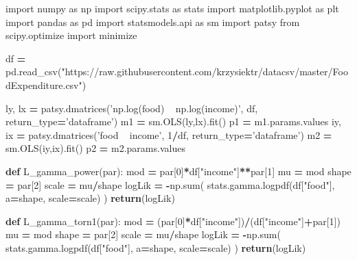 \documentclass[polish,]{book}
\newenvironment{Shaded}{\begin{snugshade}}{\end{snugshade}}
\newcommand{\BuiltInTok}[1]{#1}
\newcommand{\ControlFlowTok}[1]{\textcolor[rgb]{0.13,0.29,0.53}{\textbf{#1}}}
\newcommand{\DecValTok}[1]{\textcolor[rgb]{0.00,0.00,0.81}{#1}}
\newcommand{\ImportTok}[1]{#1}
\newcommand{\KeywordTok}[1]{\textcolor[rgb]{0.13,0.29,0.53}{\textbf{#1}}}
\newcommand{\NormalTok}[1]{#1}
\newcommand{\OperatorTok}[1]{\textcolor[rgb]{0.81,0.36,0.00}{\textbf{#1}}}
\newcommand{\StringTok}[1]{\textcolor[rgb]{0.31,0.60,0.02}{#1}}
\begin{document}
\begin{Shaded}
\begin{Highlighting}[]
\ImportTok{import}\NormalTok{ numpy }\ImportTok{as}\NormalTok{ np}
\ImportTok{import}\NormalTok{ scipy.stats }\ImportTok{as}\NormalTok{ stats}
\ImportTok{import}\NormalTok{ matplotlib.pyplot }\ImportTok{as}\NormalTok{ plt}
\ImportTok{import}\NormalTok{ pandas }\ImportTok{as}\NormalTok{ pd}
\ImportTok{import}\NormalTok{ statsmodels.api }\ImportTok{as}\NormalTok{ sm}
\ImportTok{import}\NormalTok{ patsy}
\ImportTok{from}\NormalTok{ scipy.optimize }\ImportTok{import}\NormalTok{ minimize}

\NormalTok{df }\OperatorTok{=}\NormalTok{ pd.read_csv(}\StringTok{"https://raw.githubusercontent.com/krzysiektr/datacsv/master/FoodExpenditure.csv"}\NormalTok{)}

\NormalTok{ly, lx }\OperatorTok{=}\NormalTok{ patsy.dmatrices(}\StringTok{'np.log(food) ~ np.log(income)'}\NormalTok{, df, return_type}\OperatorTok{=}\StringTok{'dataframe'}\NormalTok{)}
\NormalTok{m1 }\OperatorTok{=}\NormalTok{ sm.OLS(ly,lx).fit()}
\NormalTok{p1 }\OperatorTok{=}\NormalTok{ m1.params.values}
\NormalTok{iy, ix }\OperatorTok{=}\NormalTok{ patsy.dmatrices(}\StringTok{'food ~ income'}\NormalTok{, }\DecValTok{1}\OperatorTok{/}\NormalTok{df, return_type}\OperatorTok{=}\StringTok{'dataframe'}\NormalTok{)}
\NormalTok{m2 }\OperatorTok{=}\NormalTok{ sm.OLS(iy,ix).fit()}
\NormalTok{p2 }\OperatorTok{=}\NormalTok{ m2.params.values}

\KeywordTok{def}\NormalTok{ L_gamma_power(par):}
\NormalTok{    mod }\OperatorTok{=}\NormalTok{ par[}\DecValTok{0}\NormalTok{]}\OperatorTok{*}\NormalTok{df[}\StringTok{"income"}\NormalTok{]}\OperatorTok{**}\NormalTok{par[}\DecValTok{1}\NormalTok{]}
\NormalTok{    mu }\OperatorTok{=}\NormalTok{ mod}
\NormalTok{    shape }\OperatorTok{=}\NormalTok{ par[}\DecValTok{2}\NormalTok{]}
\NormalTok{    scale }\OperatorTok{=}\NormalTok{ mu}\OperatorTok{/}\NormalTok{shape}
\NormalTok{    logLik }\OperatorTok{=} \OperatorTok{-}\NormalTok{np.}\BuiltInTok{sum}\NormalTok{( stats.gamma.logpdf(df[}\StringTok{"food"}\NormalTok{], a}\OperatorTok{=}\NormalTok{shape, scale}\OperatorTok{=}\NormalTok{scale) )}
    \ControlFlowTok{return}\NormalTok{(logLik)}

\KeywordTok{def}\NormalTok{ L_gamma_torn1(par):}
\NormalTok{    mod }\OperatorTok{=}\NormalTok{ (par[}\DecValTok{0}\NormalTok{]}\OperatorTok{*}\NormalTok{df[}\StringTok{"income"}\NormalTok{])}\OperatorTok{/}\NormalTok{(df[}\StringTok{"income"}\NormalTok{]}\OperatorTok{+}\NormalTok{par[}\DecValTok{1}\NormalTok{])}
\NormalTok{    mu }\OperatorTok{=}\NormalTok{ mod}
\NormalTok{    shape }\OperatorTok{=}\NormalTok{ par[}\DecValTok{2}\NormalTok{]}
\NormalTok{    scale }\OperatorTok{=}\NormalTok{ mu}\OperatorTok{/}\NormalTok{shape}
\NormalTok{    logLik }\OperatorTok{=} \OperatorTok{-}\NormalTok{np.}\BuiltInTok{sum}\NormalTok{( stats.gamma.logpdf(df[}\StringTok{"food"}\NormalTok{], a}\OperatorTok{=}\NormalTok{shape, scale}\OperatorTok{=}\NormalTok{scale) )}
    \ControlFlowTok{return}\NormalTok{(logLik)}


\end{Highlighting}
\end{Shaded}
\end{document}
